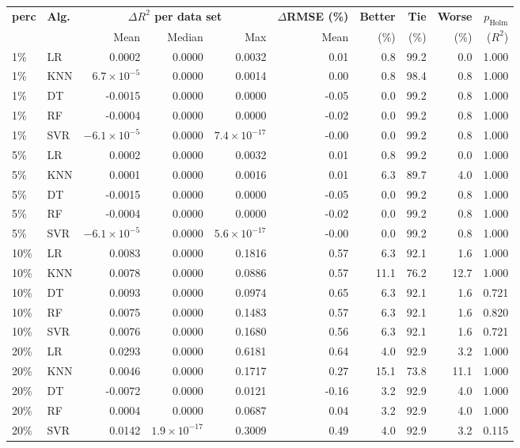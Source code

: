 \begin{tabular}{llrrrrrrrr}
\toprule
\textbf{perc} & \textbf{Alg.} & \multicolumn{3}{c}{\textbf{$\Delta R^2$ per data set}} & \textbf{$\Delta$RMSE (\%)} & \textbf{Better} & \textbf{Tie} & \textbf{Worse} & \textbf{$p_{\text{Holm}}$} \\
\cmidrule(lr){3-5}
& & Mean & Median & Max & Mean & (\%) & (\%) & (\%) & ($R^2$) \\
\midrule
1\% & LR & 0.0002 & 0.0000 & 0.0032 & 0.01 & 0.8 & 99.2 & 0.0 & 1.000 \\
1\% & KNN & $6.7\times10^{-5}$ & 0.0000 & 0.0014 & 0.00 & 0.8 & 98.4 & 0.8 & 1.000 \\
1\% & DT & -0.0015 & 0.0000 & 0.0000 & -0.05 & 0.0 & 99.2 & 0.8 & 1.000 \\
1\% & RF & -0.0004 & 0.0000 & 0.0000 & -0.02 & 0.0 & 99.2 & 0.8 & 1.000 \\
1\% & SVR & $-6.1\times10^{-5}$ & 0.0000 & $7.4\times10^{-17}$ & -0.00 & 0.0 & 99.2 & 0.8 & 1.000 \\
\midrule
5\% & LR & 0.0002 & 0.0000 & 0.0032 & 0.01 & 0.8 & 99.2 & 0.0 & 1.000 \\
5\% & KNN & 0.0001 & 0.0000 & 0.0016 & 0.01 & 6.3 & 89.7 & 4.0 & 1.000 \\
5\% & DT & -0.0015 & 0.0000 & 0.0000 & -0.05 & 0.0 & 99.2 & 0.8 & 1.000 \\
5\% & RF & -0.0004 & 0.0000 & 0.0000 & -0.02 & 0.0 & 99.2 & 0.8 & 1.000 \\
5\% & SVR & $-6.1\times10^{-5}$ & 0.0000 & $5.6\times10^{-17}$ & -0.00 & 0.0 & 99.2 & 0.8 & 1.000 \\
\midrule
10\% & LR & 0.0083 & 0.0000 & 0.1816 & 0.57 & 6.3 & 92.1 & 1.6 & 1.000 \\
10\% & KNN & 0.0078 & 0.0000 & 0.0886 & 0.57 & 11.1 & 76.2 & 12.7 & 1.000 \\
10\% & DT & 0.0093 & 0.0000 & 0.0974 & 0.65 & 6.3 & 92.1 & 1.6 & 0.721 \\
10\% & RF & 0.0075 & 0.0000 & 0.1483 & 0.57 & 6.3 & 92.1 & 1.6 & 0.820 \\
10\% & SVR & 0.0076 & 0.0000 & 0.1680 & 0.56 & 6.3 & 92.1 & 1.6 & 0.721 \\
\midrule
20\% & LR & 0.0293 & 0.0000 & 0.6181 & 0.64 & 4.0 & 92.9 & 3.2 & 1.000 \\
20\% & KNN & 0.0046 & 0.0000 & 0.1717 & 0.27 & 15.1 & 73.8 & 11.1 & 1.000 \\
20\% & DT & -0.0072 & 0.0000 & 0.0121 & -0.16 & 3.2 & 92.9 & 4.0 & 1.000 \\
20\% & RF & 0.0004 & 0.0000 & 0.0687 & 0.04 & 3.2 & 92.9 & 4.0 & 1.000 \\
20\% & SVR & 0.0142 & $1.9\times10^{-17}$ & 0.3009 & 0.49 & 4.0 & 92.9 & 3.2 & 0.115 \\
\bottomrule
\end{tabular}
